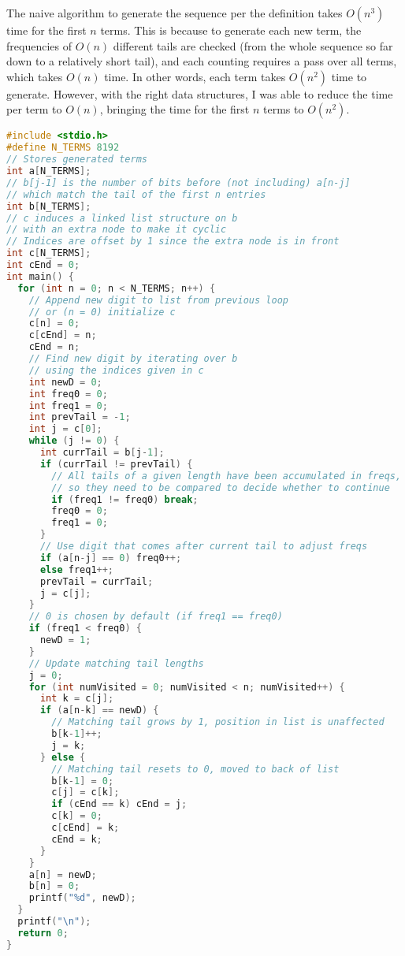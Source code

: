 \documentclass{article}
\begin{document}
The naive algorithm to generate the sequence per the definition
takes $O(n^3)$ time for the first $n$ terms.
This is because to generate each new term,
the frequencies of $O(n)$ different tails are checked
(from the whole sequence so far down to a relatively short tail),
and each counting requires a pass over all terms,
which takes $O(n)$ time.
In other words, each term takes $O(n^2)$ time to generate.
However, with the right data structures,
I was able to reduce the time per term to $O(n)$,
bringing the time for the first $n$ terms to $O(n^2)$.

\newpage

\begin{lstlisting}[language=c]
#include <stdio.h>
#define N_TERMS 8192
// Stores generated terms
int a[N_TERMS];
// b[j-1] is the number of bits before (not including) a[n-j]
// which match the tail of the first n entries
int b[N_TERMS];
// c induces a linked list structure on b
// with an extra node to make it cyclic
// Indices are offset by 1 since the extra node is in front
int c[N_TERMS];
int cEnd = 0;
int main() {
  for (int n = 0; n < N_TERMS; n++) {
    // Append new digit to list from previous loop
    // or (n = 0) initialize c
    c[n] = 0;
    c[cEnd] = n;
    cEnd = n;
    // Find new digit by iterating over b
    // using the indices given in c
    int newD = 0;
    int freq0 = 0;
    int freq1 = 0;
    int prevTail = -1;
    int j = c[0];
    while (j != 0) { 
      int currTail = b[j-1];
      if (currTail != prevTail) {
        // All tails of a given length have been accumulated in freqs,
        // so they need to be compared to decide whether to continue
        if (freq1 != freq0) break;
        freq0 = 0;
        freq1 = 0;
      }
      // Use digit that comes after current tail to adjust freqs
      if (a[n-j] == 0) freq0++;
      else freq1++;
      prevTail = currTail;
      j = c[j];
    }
    // 0 is chosen by default (if freq1 == freq0)
    if (freq1 < freq0) {
      newD = 1;
    }
    // Update matching tail lengths
    j = 0;
    for (int numVisited = 0; numVisited < n; numVisited++) {
      int k = c[j];
      if (a[n-k] == newD) {
        // Matching tail grows by 1, position in list is unaffected
        b[k-1]++;
        j = k;
      } else {
        // Matching tail resets to 0, moved to back of list
        b[k-1] = 0;
        c[j] = c[k];
        if (cEnd == k) cEnd = j;
        c[k] = 0;
        c[cEnd] = k;
        cEnd = k;
      }
    }
    a[n] = newD;
    b[n] = 0;
    printf("%d", newD);
  }
  printf("\n");
  return 0;
}
\end{lstlisting}
\end{document}
